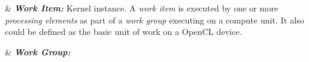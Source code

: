 
\begin{easylist}
    & \textbf{\textit{Work Item:}} Kernel instance. A \emph{work item} is executed by one or more \emph{processing elements} as 
        part of a \emph{work group} executing on a compute unit\cite{opencl12}. It also could be defined as the basic unit of work
        on a OpenCL device\cite{intro_opencl}.

    &  \textbf{\textit{Work Group:}}
\end{easylist}
